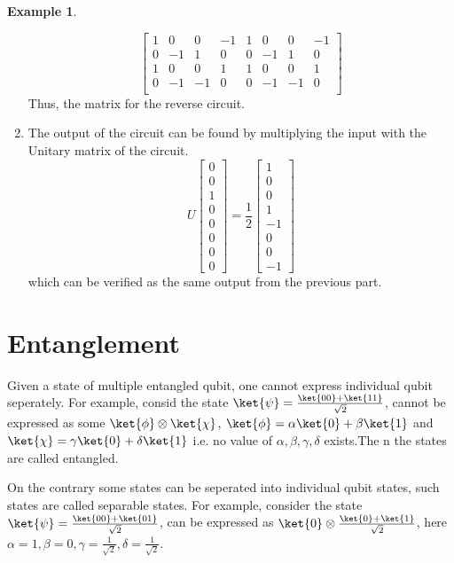 \documentclass[12pt, oneside]{book}
\theoremstyle{definition}
\theoremstyle{definition}
\newtheorem{example}{Example}[section]
\theoremstyle{remark}
\begin{document}
\begin{example}
\begin{enumerate}
\[\begin{bmatrix}
                1 & 0 & 0 & -1 & 1 & 0 & 0 & -1 \\
                0 & -1 & 1 & 0 & 0 & -1 & 1 & 0 \\
                1 & 0 & 0 & 1 & 1 & 0 & 0 & 1 \\
                0 & -1 & -1 & 0 & 0 & -1 & -1 & 0 \\
            \end{bmatrix}
        \]
        Thus, the matrix for the reverse circuit.
        \item The output of the circuit can be found by multiplying the input with the Unitary matrix of the circuit.
        \[
            U\begin{bmatrix} 0 \\ 0 \\ 1 \\ 0 \\ 0 \\ 0 \\ 0 \\ 0 \end{bmatrix}=\frac{1}{2}\begin{bmatrix} 1 \\ 0 \\ 0 \\ 1 \\ -1 \\ 0 \\ 0 \\ -1 \end{bmatrix}
        \]
        which can be verified as the same output from the previous part.
    \end{enumerate}
\end{example}

\chapter{Entanglement}
Given a state of multiple entangled qubit, one cannot express individual qubit seperately.
For example, consid the state $\ket{\psi} = \frac{\ket{00}+\ket{11}}{\sqrt{2}}$, cannot be expressed as some $\ket{\phi} \otimes \ket{\chi}$,
$\ket{\phi}=\alpha \ket{0} + \beta \ket{1}$ and $\ket{\chi}=\gamma \ket{0} + \delta \ket{1}$ i.e. no value of $\alpha, \beta, \gamma, \delta$ exists.The
n the states are called entangled.

On the contrary some states can be seperated into individual qubit states, such states are called separable states.
For example, consider the state $\ket{\psi} = \frac{\ket{00}+\ket{01}}{\sqrt{2}}$, can be expressed as $\ket{0} \otimes \frac{\ket{0}+\ket{1}}{\sqrt{2}}$, here
$\alpha =1 ,\beta =0,\gamma = \frac{1}{\sqrt{2}},\delta = \frac{1}{\sqrt{2}}$.
\end{document}
